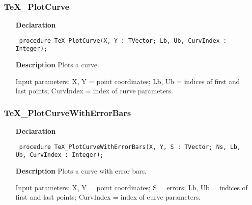 \documentclass[12pt,a4paper,oneside]{report}
\newcommand{\declarationitem}[1]{\textbf{#1}}
\newcommand{\descriptiontitle}[1]{\textbf{#1}}
\newcommand{\code}[1]{\texttt{#1}}
\begin{document}
\subsubsection{TeX{\_}PlotCurve}
\label{utexplot-TeX_PlotCurve}
\begin{itemize}\item[\declarationitem{Declaration}\hfill]
	\begin{flushleft}
		\code{
			procedure TeX{\_}PlotCurve(X, Y : TVector; Lb, Ub, CurvIndex : Integer);}
		
	\end{flushleft}
	
	\par
	\item[\descriptiontitle{Description}]
	Plots a curve.
	
	Input parameters: X, Y = point coordinates; Lb, Ub = indices of first and last points; CurvIndex = index of curve parameters.
	
\end{itemize}
\subsubsection{TeX{\_}PlotCurveWithErrorBars}
\label{utexplot-TeX_PlotCurveWithErrorBars}
\begin{itemize}\item[\declarationitem{Declaration}\hfill]
	\begin{flushleft}
		\code{
			procedure TeX{\_}PlotCurveWithErrorBars(X, Y, S : TVector; Ns, Lb, Ub, CurvIndex : Integer);}
		
	\end{flushleft}
	
	\par
	\item[\descriptiontitle{Description}]
	Plots a curve with error bars.
	
	Input parameters: X, Y = point coordinates; S = errors; Lb, Ub = indices of first and last points; CurvIndex = index of curve parameters.
	
\end{itemize}
\end{document}
